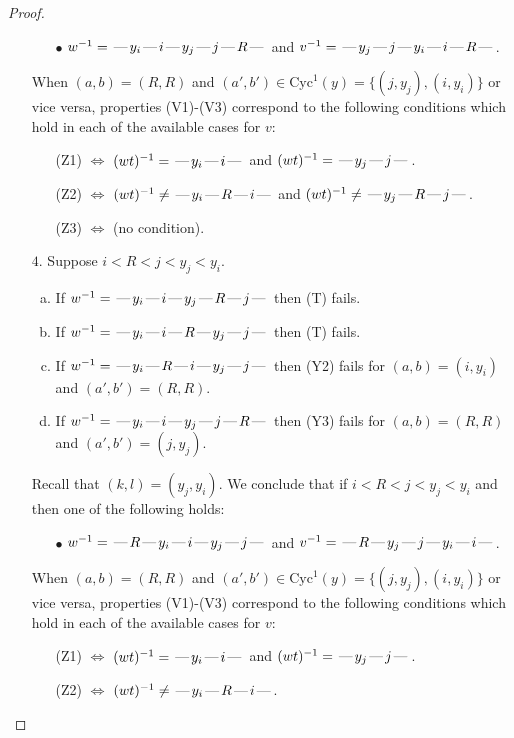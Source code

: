 \documentclass[10pt]{article}
\theoremstyle{definition}
\theoremstyle{definition}
\def\dash{\text{\hspace{0.5mm}---\hspace{0.5mm}}}
\def\Cyc{\mathrm{Cyc}}
\begin{document}
\begin{proof}
\begin{enumerate}
\begin{enumerate}
\item[$\bullet$] $w^{-1} = \dash y_i\dash i\dash y_j\dash j\dash R\dash $ and $v^{-1} = \dash y_j\dash j\dash y_i\dash i\dash R\dash $.
\end{enumerate}
When $(a,b)= (R, R)$ and $(a',b')\in \Cyc^1(y)=\{(j,y_j),(i,y_i)\}$ or vice versa,
properties (V1)-(V3) correspond to the following conditions which hold in
each of the available cases for $v$:
\begin{enumerate}
\item[](Z1) $\Leftrightarrow$ $(wt)^{-1} = \dash y_i \dash i \dash$  and $(wt)^{-1} = \dash y_j \dash j \dash$.
\item[](Z2) $\Leftrightarrow$ $(wt)^{-1} \neq \dash y_i \dash R \dash i \dash$  and $(wt)^{-1} \neq \dash y_j \dash R \dash j \dash$.
\item[](Z3) $\Leftrightarrow$ (no condition).
\end{enumerate}
\item[$4$.] Suppose $i < R < j < y_j < y_i$.
\begin{enumerate}[(a)]
\item If $w^{-1} = \dash y_i\dash i\dash y_j\dash R\dash j\dash $ then (T) fails.
\item If $w^{-1} = \dash y_i\dash i\dash R\dash y_j\dash j\dash $ then (T) fails.
\item If $w^{-1} = \dash y_i\dash R\dash i\dash y_j\dash j\dash $ then (Y2) fails for $(a,b)=(i,y_i)$ and $(a',b')=(R,R)$.
\item If $w^{-1} = \dash y_i\dash i\dash y_j\dash j\dash R\dash $ then (Y3) fails for $(a,b)=(R,R)$ and $(a',b')=(j,y_j)$.
\end{enumerate}
Recall that $(k,l) = (y_j,y_i)$.
We conclude that if $i < R < j < y_j < y_i$ and then one of the following holds:
\begin{enumerate}
\item[$\bullet$] $w^{-1} = \dash R\dash y_i\dash i\dash y_j\dash j\dash $ and $v^{-1} = \dash R\dash y_j\dash j\dash y_i\dash i\dash $.
\end{enumerate}
When $(a,b)= (R, R)$ and $(a',b')\in \Cyc^1(y)=\{(j,y_j),(i,y_i)\}$ or vice versa,
properties (V1)-(V3) correspond to the following conditions which hold in
each of the available cases for $v$:
\begin{enumerate}
\item[](Z1) $\Leftrightarrow$ $(wt)^{-1} = \dash y_i \dash i \dash$  and $(wt)^{-1} = \dash y_j \dash j \dash$.
\item[](Z2) $\Leftrightarrow$ $(wt)^{-1} \neq \dash y_i \dash R \dash i \dash$.

\end{enumerate}
\end{enumerate}
\end{proof}
\end{document}
